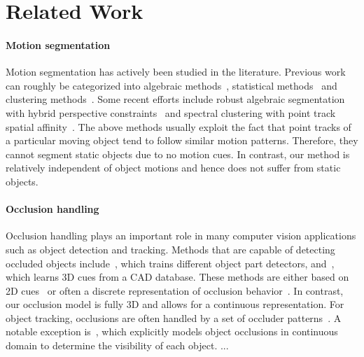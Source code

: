 \section{Related Work}
\label{sec:related}


\paragraph{Motion segmentation}
Motion segmentation has actively been studied in the literature. Previous work can roughly be categorized into algebraic methods~\cite{}, statistical methods~\cite{} and clustering methods~\cite{}. Some recent efforts include robust algebraic segmentation with hybrid perspective constraints~\cite{} and spectral clustering with point track spatial affinity~\cite{}. The above methods usually exploit the fact that point tracks of a particular moving object tend to follow similar motion patterns. Therefore, they cannot segment static objects due to no motion cues. In contrast, our method is relatively independent of object motions and hence does not suffer from static objects. 

\paragraph{Occlusion handling}
Occlusion handling plays an important role in many computer vision applications such as object detection and tracking. Methods that are capable of detecting occluded objects include~\cite{}, which trains different object part detectors, and~\cite{}, which learns 3D cues from a CAD database. These methods are either based on 2D cues~\cite{} or often a discrete representation of occlusion behavior~\cite{}. In contrast, our occlusion model is fully 3D and allows for a continuous representation. For object tracking, occlusions are often handled by a set of occluder patterns~\cite{}. A notable exception is~\cite{}, which explicitly models object occlusions in continuous domain to determine the visibility of each object. ...

